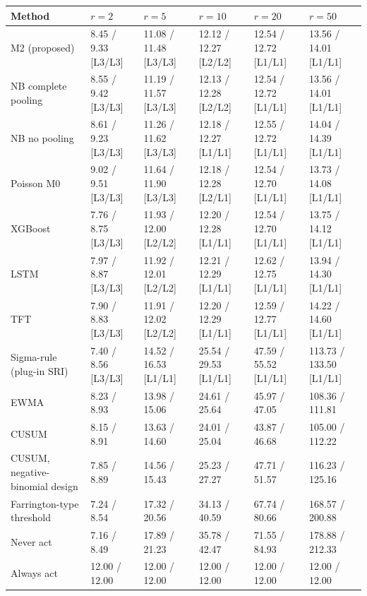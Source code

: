 \noindent\begin{minipage}{\linewidth}
\label{tab:S21_4}
\centering\scriptsize
\begin{tabular}{llllll}
\toprule
Method & $r = 2$ & $r = 5$ & $r = 10$ & $r = 20$ & $r = 50$ \\ \midrule
M2 (proposed) & 8.45 / 9.33 [L3/L3] & 11.08 / 11.48 [L3/L3] & 12.12 / 12.27 [L2/L2] & 12.54 / 12.72 [L1/L1] & 13.56 / 14.01 [L1/L1] \\
NB complete pooling & 8.55 / 9.42 [L3/L3] & 11.19 / 11.57 [L3/L3] & 12.13 / 12.28 [L2/L2] & 12.54 / 12.72 [L1/L1] & 13.56 / 14.01 [L1/L1] \\
NB no pooling & 8.61 / 9.23 [L3/L3] & 11.26 / 11.62 [L3/L3] & 12.18 / 12.27 [L1/L1] & 12.55 / 12.72 [L1/L1] & 14.04 / 14.39 [L1/L1] \\
Poisson M0 & 9.02 / 9.51 [L3/L3] & 11.64 / 11.90 [L3/L3] & 12.18 / 12.28 [L2/L1] & 12.54 / 12.70 [L1/L1] & 13.73 / 14.08 [L1/L1] \\
XGBoost & 7.76 / 8.75 [L3/L3] & 11.93 / 12.00 [L2/L2] & 12.20 / 12.28 [L1/L1] & 12.54 / 12.70 [L1/L1] & 13.75 / 14.12 [L1/L1] \\
LSTM & 7.97 / 8.87 [L3/L3] & 11.92 / 12.01 [L2/L2] & 12.21 / 12.29 [L1/L1] & 12.62 / 12.75 [L1/L1] & 13.94 / 14.30 [L1/L1] \\
TFT & 7.90 / 8.83 [L3/L3] & 11.91 / 12.02 [L2/L2] & 12.20 / 12.29 [L1/L1] & 12.59 / 12.77 [L1/L1] & 14.22 / 14.60 [L1/L1] \\
Sigma-rule (plug-in SRI) & 7.40 / 8.56 [L3/L3] & 14.52 / 16.53 [L1/L1] & 25.54 / 29.53 [L1/L1] & 47.59 / 55.52 [L1/L1] & 113.73 / 133.50 [L1/L1] \\
EWMA & 8.23 / 8.93 & 13.98 / 15.06 & 24.61 / 25.64 & 45.97 / 47.05 & 108.36 / 111.81 \\
CUSUM & 8.15 / 8.91 & 13.63 / 14.60 & 24.01 / 25.04 & 43.87 / 46.68 & 105.00 / 112.22 \\
CUSUM, negative-binomial design & 7.85 / 8.89 & 14.56 / 15.43 & 25.23 / 27.27 & 47.71 / 51.57 & 116.23 / 125.16 \\
Farrington-type threshold & 7.24 / 8.54 & 17.32 / 20.56 & 34.13 / 40.59 & 67.74 / 80.66 & 168.57 / 200.88 \\
Never act & 7.16 / 8.49 & 17.89 / 21.23 & 35.78 / 42.47 & 71.55 / 84.93 & 178.88 / 212.33 \\
Always act & 12.00 / 12.00 & 12.00 / 12.00 & 12.00 / 12.00 & 12.00 / 12.00 & 12.00 / 12.00 \\
\bottomrule
\end{tabular}
\end{minipage}
\vspace{14pt}


